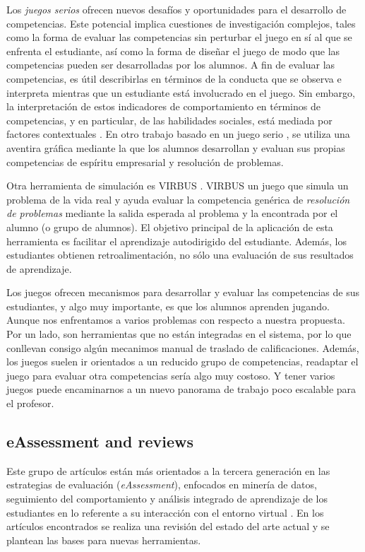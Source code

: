 Los \emph{juegos serios} ofrecen nuevos desafíos y oportunidades para el desarrollo de competencias. Este potencial implica cuestiones de investigación complejos, tales como la forma de evaluar las competencias sin perturbar el juego en sí al que se enfrenta el estudiante, así como la forma de diseñar el juego de modo que las competencias pueden ser desarrolladas por los alumnos. A fin de evaluar las competencias, es útil describirlas en términos de la conducta que se observa e interpreta mientras que un estudiante está involucrado en el juego. Sin embargo, la interpretación de estos indicadores de comportamiento en términos de competencias, y en particular, de las habilidades sociales, está mediada por factores contextuales \cite{Bedek:2011}. En otro trabajo basado en un juego serio \cite{Guenaga:2013}, se utiliza una aventira gráfica mediante la que los alumnos desarrollan y evaluan sus propias competencias de espíritu empresarial y resolución de problemas.

Otra herramienta de simulación es VIRBUS \cite{Starcic:2008,Starcic:2008a}. VIRBUS un juego que simula un problema de la vida real y ayuda evaluar la competencia genérica de \emph{resolución de problemas} mediante la salida esperada al problema y la encontrada por el alumno (o grupo de alumnos). El objetivo principal de la aplicación de esta herramienta es facilitar el aprendizaje autodirigido del estudiante. Además, los estudiantes obtienen retroalimentación, no sólo una evaluación de sus resultados de aprendizaje.

Los juegos ofrecen mecanismos para desarrollar y evaluar las competencias de sus estudiantes, y algo muy importante, es que los alumnos aprenden jugando. Aunque nos enfrentamos a varios problemas con respecto a nuestra propuesta. Por un lado, son herramientas que no están integradas en el sistema, por lo que conllevan consigo algún mecanimos manual de traslado de calificaciones. Además, los juegos suelen ir orientados a un reducido grupo de competencias, readaptar el juego para evaluar otra competencias sería algo muy costoso. Y tener varios juegos puede encaminarnos a un nuevo panorama de trabajo poco escalable para el profesor. 


\subsection{eAssessment and reviews}
Este grupo de artículos están más orientados a la tercera generación en las estrategias de evaluación (\emph{eAssessment}), enfocados en minería de datos, seguimiento del comportamiento y análisis integrado de aprendizaje de los estudiantes en lo referente a su interacción con el entorno virtual \cite{Redecker:2012,Redecker:2013}. En los artículos encontrados se realiza una revisión del estado del arte actual y se plantean las bases para nuevas herramientas.

